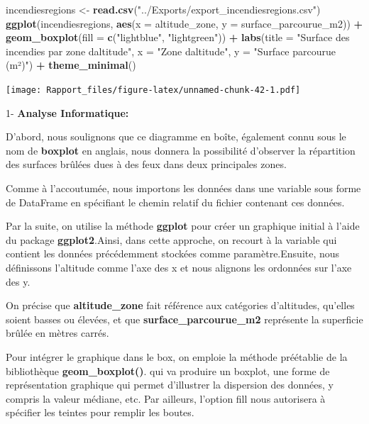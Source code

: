 \documentclass[
]{article}
\newenvironment{Shaded}{\begin{snugshade}}{\end{snugshade}}
\newcommand{\AttributeTok}[1]{\textcolor[rgb]{0.13,0.29,0.53}{#1}}
\newcommand{\FunctionTok}[1]{\textcolor[rgb]{0.13,0.29,0.53}{\textbf{#1}}}
\newcommand{\NormalTok}[1]{#1}
\newcommand{\OtherTok}[1]{\textcolor[rgb]{0.56,0.35,0.01}{#1}}
\newcommand{\SpecialCharTok}[1]{\textcolor[rgb]{0.81,0.36,0.00}{\textbf{#1}}}
\newcommand{\StringTok}[1]{\textcolor[rgb]{0.31,0.60,0.02}{#1}}
\begin{document}
\begin{Shaded}
\begin{Highlighting}[]
\NormalTok{incendiesregions }\OtherTok{\textless{}{-}} \FunctionTok{read.csv}\NormalTok{(}\StringTok{"../Exports/export\_incendiesregions.csv"}\NormalTok{)}
\FunctionTok{ggplot}\NormalTok{(incendiesregions, }\FunctionTok{aes}\NormalTok{(}\AttributeTok{x =}\NormalTok{ altitude\_zone, }\AttributeTok{y =}\NormalTok{ surface\_parcourue\_m2)) }\SpecialCharTok{+}
  \FunctionTok{geom\_boxplot}\NormalTok{(}\AttributeTok{fill =} \FunctionTok{c}\NormalTok{(}\StringTok{"lightblue"}\NormalTok{, }\StringTok{"lightgreen"}\NormalTok{)) }\SpecialCharTok{+}
  \FunctionTok{labs}\NormalTok{(}\AttributeTok{title =} \StringTok{"Surface des incendies par zone d\textquotesingle{}altitude"}\NormalTok{, }
       \AttributeTok{x =} \StringTok{"Zone d\textquotesingle{}altitude"}\NormalTok{, }
       \AttributeTok{y =} \StringTok{"Surface parcourue (m²)"}\NormalTok{) }\SpecialCharTok{+}
  \FunctionTok{theme\_minimal}\NormalTok{()}
\end{Highlighting}
\end{Shaded}

\texttt{[image: Rapport\_files/figure-latex/unnamed-chunk-42-1.pdf]}

1- \textbf{Analyse Informatique:}

D'abord, nous soulignons que ce diagramme en boîte, également connu sous
le nom de \textbf{boxplot} en anglais, nous donnera la possibilité
d'observer la répartition des surfaces brûlées dues à des feux dans deux
principales zones.

Comme à l'accoutumée, nous importons les données dans une variable sous
forme de DataFrame en spécifiant le chemin relatif du fichier contenant
ces données.

Par la suite, on utilise la méthode \textbf{ggplot} pour créer un
graphique initial à l'aide du package \textbf{ggplot2}.Ainsi, dans cette
approche, on recourt à la variable qui contient les données précédemment
stockées comme paramètre.Ensuite, nous définissons l'altitude comme
l'axe des x et nous alignons les ordonnées sur l'axe des y.

On précise que \textbf{altitude\_zone} fait référence aux catégories
d'altitudes, qu'elles soient basses ou élevées, et que
\textbf{surface\_parcourue\_m2} représente la superficie brûlée en
mètres carrés.

Pour intégrer le graphique dans le box, on emploie la méthode préétablie
de la bibliothèque \textbf{geom\_boxplot()}. qui va produire un boxplot,
une forme de représentation graphique qui permet d'illustrer la
dispersion des données, y compris la valeur médiane, etc. Par ailleurs,
l'option fill nous autorisera à spécifier les teintes pour remplir les
boutes.
\end{document}

